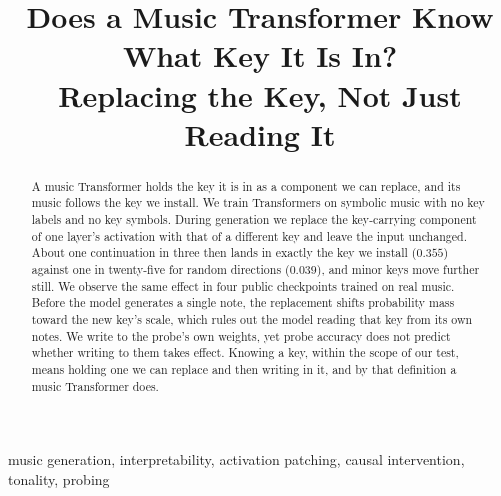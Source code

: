 \documentclass{article}
\title{Does a Music Transformer Know What Key It Is In?\\
Replacing the Key, Not Just Reading It}
\begin{document}
\ninept
\maketitle

\setlength{\abovedisplayskip}{3pt plus 1pt minus 1pt}
\setlength{\belowdisplayskip}{3pt plus 1pt minus 1pt}
\setlength{\abovedisplayshortskip}{2pt plus 1pt}
\setlength{\belowdisplayshortskip}{2pt plus 1pt}

\begin{abstract}
A music Transformer holds the key it is in as a component we can replace, and its music follows the key we install.
We train Transformers on symbolic music with no key labels and no key symbols.
During generation we replace the key-carrying component of one layer's activation with that of a different key and leave the input unchanged.
About one continuation in three then lands in exactly the key we install ($0.355$) against one in twenty-five for random directions ($0.039$), and minor keys move further still.
We observe the same effect in four public checkpoints trained on real music.
Before the model generates a single note, the replacement shifts probability mass toward the new key's scale, which rules out the model reading that key from its own notes.
We write to the probe's own weights, yet probe accuracy does not predict whether writing to them takes effect.
Knowing a key, within the scope of our test, means holding one we can replace and then writing in it, and by that definition a music Transformer does.
\end{abstract}

\begin{keywords}
music generation, interpretability, activation patching, causal intervention, tonality, probing
\end{keywords}
\end{document}
